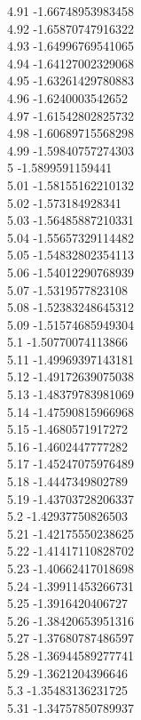 {4.91	-1.66748953983458\\
4.92	-1.65870747916322\\
4.93	-1.64996769541065\\
4.94	-1.64127002329068\\
4.95	-1.63261429780883\\
4.96	-1.6240003542652\\
4.97	-1.61542802825732\\
4.98	-1.60689715568298\\
4.99	-1.59840757274303\\
5	-1.5899591159441\\
5.01	-1.58155162210132\\
5.02	-1.573184928341\\
5.03	-1.56485887210331\\
5.04	-1.55657329114482\\
5.05	-1.54832802354113\\
5.06	-1.54012290768939\\
5.07	-1.5319577823108\\
5.08	-1.52383248645312\\
5.09	-1.51574685949304\\
5.1	-1.50770074113866\\
5.11	-1.49969397143181\\
5.12	-1.49172639075038\\
5.13	-1.48379783981069\\
5.14	-1.47590815966968\\
5.15	-1.4680571917272\\
5.16	-1.4602447777282\\
5.17	-1.45247075976489\\
5.18	-1.4447349802789\\
5.19	-1.43703728206337\\
5.2	-1.42937750826503\\
5.21	-1.42175550238625\\
5.22	-1.41417110828702\\
5.23	-1.40662417018698\\
5.24	-1.39911453266731\\
5.25	-1.3916420406727\\
5.26	-1.38420653951316\\
5.27	-1.37680787486597\\
5.28	-1.36944589277741\\
5.29	-1.3621204396646\\
5.3	-1.35483136231725\\
5.31	-1.34757850789937\\
}
